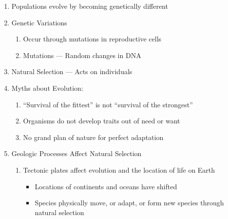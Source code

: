 \documentclass[12pt]{article}
\begin{document}
\begin{enumerate}
\begin{enumerate}
    \end{enumerate}

  \item Populations evolve by becoming genetically different

  \item Genetic Variations

    \begin{enumerate}

      \item Occur through mutations in reproductive cells

      \item Mutations — Random changes in DNA

    \end{enumerate}

  \item Natural Selection — Acts on individuals

  \item Myths about Evolution:

    \begin{enumerate}

      \item “Survival of the fittest” is not “survival of the strongest”

      \item Organisms do not develop traits out of need or want

      \item No grand plan of nature for perfect adaptation

    \end{enumerate}

  \item Geologic Processes Affect Natural Selection

    \begin{enumerate}

      \item Tectonic plates affect evolution and the location of life on Earth

        \begin{itemize}

          \item Locations of continents and oceans have shifted

          \item Species physically move, or adapt, or form new species through natural selection

        \end{itemize}


\end{enumerate}
\end{enumerate}
\end{document}

